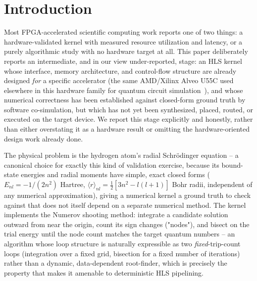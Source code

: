 \documentclass[pdflatex,sn-mathphys,Numbered]{sn-jnl}
\begin{document}

\maketitle

\section{Introduction}\label{sec:intro}

Most FPGA-accelerated scientific computing work reports one of two things: a hardware-validated kernel with measured resource utilization and latency, or a purely algorithmic study with no hardware target at all. This paper deliberately reports an intermediate, and in our view under-reported, stage: an HLS kernel whose interface, memory architecture, and control-flow structure are already designed \emph{for} a specific accelerator (the same AMD/Xilinx Alveo U55C used elsewhere in this hardware family for quantum circuit simulation~\cite{ali_rtl_statevector,ali_surface_code}), and whose numerical correctness has been established against closed-form ground truth by software co-simulation, but which has not yet been synthesized, placed, routed, or executed on the target device. We report this stage explicitly and honestly, rather than either overstating it as a hardware result or omitting the hardware-oriented design work already done.

The physical problem is the hydrogen atom's radial Schr\"odinger equation -- a canonical choice for exactly this kind of validation exercise, because its bound-state energies and radial moments have simple, exact closed forms ($E_{nl}=-1/(2n^2)$ Hartree, $\langle r\rangle_{nl}=\tfrac12[3n^2-l(l+1)]$ Bohr radii, independent of any numerical approximation), giving a numerical kernel a ground truth to check against that does not itself depend on a separate numerical method. The kernel implements the Numerov shooting method: integrate a candidate solution outward from near the origin, count its sign changes ("nodes"), and bisect on the trial energy until the node count matches the target quantum numbers -- an algorithm whose loop structure is naturally expressible as two \emph{fixed}-trip-count loops (integration over a fixed grid, bisection for a fixed number of iterations) rather than a dynamic, data-dependent root-finder, which is precisely the property that makes it amenable to deterministic HLS pipelining.
\end{document}

